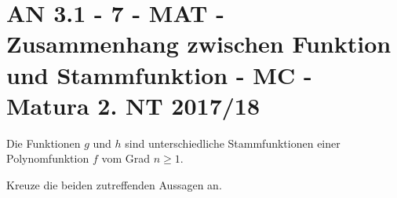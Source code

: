 \section{AN 3.1 - 7 - MAT - Zusammenhang zwischen Funktion und Stammfunktion - MC - Matura 2. NT 2017/18}

\begin{beispiel}[AN 3.1]{1}
Die Funktionen $g$ und $h$ sind unterschiedliche Stammfunktionen einer Polynomfunktion $f$ vom Grad $n \geq 1$.

Kreuze die beiden zutreffenden Aussagen an.

\end{beispiel}